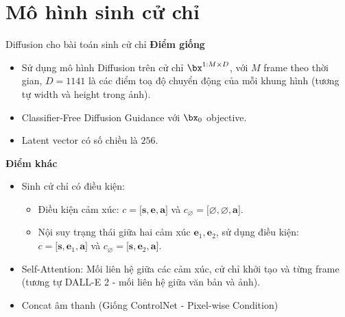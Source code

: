 
\section{Mô hình sinh cử chỉ}

%


\begin{frame}{Diffusion cho bài toán sinh cử chỉ}
	\textbf{Điểm giống}
	\begin{itemize}
		\item Sử dụng mô hình Diffusion \cite{yang2023diffusestylegesture} trên cử chỉ $\bx^{1:M \times D}$,  với $M$ frame theo thời gian, $D=1141$ là các điểm toạ độ chuyển động của mỗi khung hình (tương tự width và height trong ảnh).
		\item Classifier-Free Diffusion Guidance với $\bx_0$ objective.
		\item Latent vector có số chiều là $256$.
		\end{itemize}
		
		\textbf{Điểm khác}
		
		\begin{itemize}
			\item Sinh cử chỉ có điều kiện:
			\begin{itemize}
				\item Điều kiện cảm xúc: $c = \big[ \mathbf{s}, \mathbf{e}, \mathbf{a} \big]$ và $c_{\varnothing} = \big[ \varnothing, \varnothing, \mathbf{a} \big]$.
				\item Nội suy trạng thái giữa hai cảm xúc $\mathbf{e}_1, \mathbf{e}_2$, sử dụng điều kiện: $c = \big[ \mathbf{s}, \mathbf{e}_1, \mathbf{a} \big]$ và $c_{\varnothing} = \big[ \mathbf{s}, \mathbf{e}_2, \mathbf{a} \big]$.
			\end{itemize}
			\item Self-Attention: Mối liên hệ giữa các cảm xúc, cử chỉ khởi tạo và từng frame (tương tự DALL-E 2 - mối liên hệ giữa văn bản và ảnh).
			\item Concat âm thanh (Giống ControlNet - Pixel-wise Condition)
		\end{itemize}
\end{frame}

